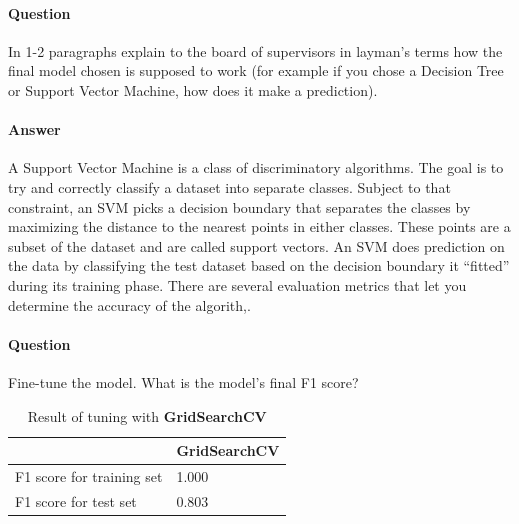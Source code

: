 \documentclass[12pt]{article}
\begin{document}
\paragraph{\textbf{Question}} In 1-2 paragraphs explain to the board of supervisors in layman's terms how the final model chosen is supposed to work (for example if you chose a Decision Tree or Support Vector Machine, how does it make a prediction).

\paragraph{\textbf{Answer}} A Support Vector Machine is a class of discriminatory algorithms. The goal is to try and correctly classify a dataset into separate classes. Subject to that constraint, an SVM  picks a decision boundary that separates the classes by maximizing the distance to the nearest points in either classes. These points are a subset of the dataset and are called support vectors. An SVM does prediction on the data by classifying the test dataset based on the decision boundary it ``fitted'' during its training phase. There are several evaluation metrics that let you determine the accuracy of the algorith,.


\paragraph{\textbf{Question}} Fine-tune the model. What is the model's final F1 score?

\setlength{\extrarowheight}{1.5pt}
\begin{table}[!htbp]
\caption{Result of tuning with \textbf{GridSearchCV}} %
\centering %
\begin{tabular}{|p{4cm}||p{4cm}|} %
\hline %
& GridSearchCV\\[0.5ex]
\hline %

F1 score for training set     &1.000\\
F1 score for test set         &0.803\\
\hline %
\end{tabular}
\label{tunedGridSearch}
\end{table}








\end{document}
